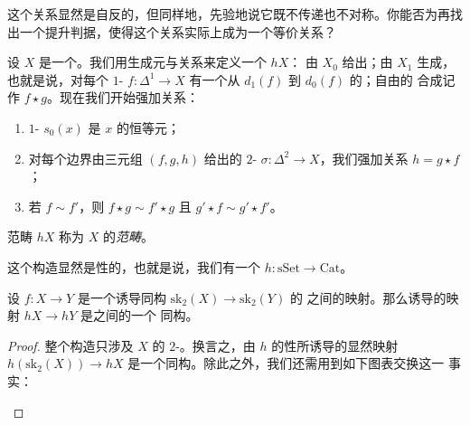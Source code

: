 \begin{observation}\label{obs:equivalence-relation-reflexive}
这个关系显然是自反的，但同样地，先验地说它既不传递也不对称。你能否为\trComposer{}再找
出一个提升判据，使得这个关系实际上成为一个等价关系？
\end{observation}

\begin{definition}\label{def:homotopy-category}
设 $X$ 是一个\trSimplicialSet{}。我们用生成元与关系来定义一个\trCategory{} $hX$：
\trObject{}由 $X_0$ 给出；\trMorphism{}由 $X_1$ 生成，也就是说，对每个 $1$-\trSimplex{}%
$f\colon \Delta^1 \to X$ 有一个从 $d_1(f)$ 到 $d_0(f)$ 的\trMorphism{}；自由的
合成记作 $f \star g$。现在我们开始强加关系：
\begin{enumerate}[label=(\arabic*)]
  \item $1$-\trSimplex{} $s_0(x)$ 是 $x$ 的恒等元；
  \item 对每个边界由三元组 $(f, g, h)$ 给出的 $2$-\trSimplex{}%
  $\sigma\colon \Delta^2 \to X$，我们强加关系 $h = g \star f$；
  \item 若 $f \sim f'$，则 $f \star g \sim f' \star g$ 且
  $g' \star f \sim g' \star f'$。
\end{enumerate}
范畴 $hX$ 称为 $X$ 的\emph{\trHomotopy{}范畴}。
\end{definition}

\begin{remark}\label{rem:homotopy-category-functorial}
这个构造显然是\trFunctor{}性的，也就是说，我们有一个\trFunctor{}%
$h\colon \mathrm{sSet} \to \mathrm{Cat}$。
\end{remark}

\begin{lemma}\label{lem:homotopy-category-skeleton}
设 $f\colon X \to Y$ 是一个诱导同构 $\mathrm{sk}_2(X) \to \mathrm{sk}_2(Y)$ 的%
\trSimplicialSet{}之间的映射。那么诱导的映射 $hX \to hY$ 是\trCategory{}之间的一个
同构。
\end{lemma}

\begin{proof}
整个构造只涉及 $X$ 的 $2$-\trSkeleton{}。换言之，由 $h$ 的\trFunctor{}性所诱导的显然映射
$h(\mathrm{sk}_2(X)) \to hX$ 是一个同构。除此之外，我们还需用到如下图表交换这一
事实：
\begin{center}
\end{center}
\end{proof}


